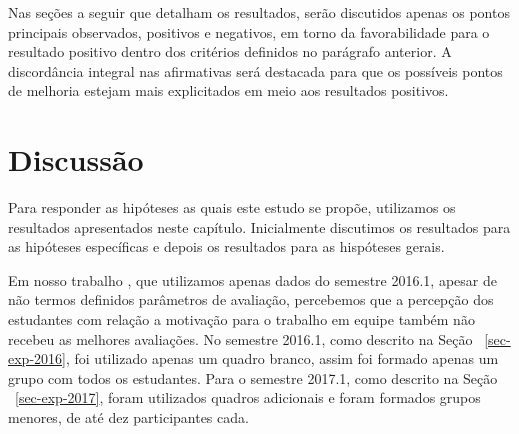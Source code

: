Nas seções a seguir que detalham os resultados, serão discutidos apenas os
pontos principais observados, positivos e negativos, em torno da
favorabilidade para o resultado positivo dentro dos critérios
definidos no parágrafo anterior.
A discordância integral nas afirmativas será destacada para que
os possíveis pontos de melhoria estejam mais explicitados em meio
aos resultados positivos.




\section{Discussão}
\label{sec-avaliacao-hipoteses}
Para responder as hipóteses as quais este estudo se propõe, utilizamos
os resultados apresentados neste capítulo.
Inicialmente discutimos os resultados para as hipóteses
específicas e depois os resultados para as hispóteses gerais.


\AprovacaoHipoteseResultado{}{}{}{}{}{}{}{}{}


Em nosso trabalho \cite{gavaza2017}, que utilizamos apenas dados do
semestre 2016.1, apesar de não termos definidos parâmetros
de avaliação, percebemos que a percepção dos estudantes com relação
a motivação para o trabalho em equipe também não recebeu as melhores
avaliações.
No semestre 2016.1, como descrito na Seção ~\ref{sec-exp-2016}, foi utilizado
apenas um quadro branco, assim foi formado apenas um grupo com todos
os estudantes.
Para o semestre 2017.1, como descrito na Seção ~\ref{sec-exp-2017}, foram
utilizados quadros adicionais e foram formados grupos menores,
de até dez participantes cada.

